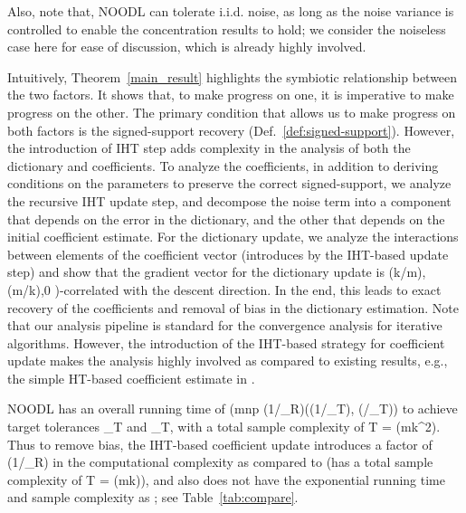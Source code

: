 \documentclass{article}
\def\[#1\]{{$#1$}}
\begin{document}
Also, note that, NOODL can tolerate i.i.d. noise, as long as the noise variance is controlled to enable the concentration results to hold; we consider the noiseless case here for ease of discussion, which is already highly involved.


Intuitively, Theorem~\ref{main_result} highlights the symbiotic relationship between the two factors. It shows that, to make progress on one, it is imperative to make progress on the other. The primary condition that allows us to make progress on both factors is the signed-support recovery (Def.~\ref{def:signed-support}). However, the introduction of IHT step adds complexity in the analysis of both the dictionary and coefficients. To analyze the coefficients, in addition to deriving conditions on the parameters to preserve the correct signed-support, we analyze the recursive IHT update step, and decompose the noise term into a component that depends on the error in the dictionary, and the other that depends on the initial coefficient estimate. For the dictionary update, we analyze the interactions between elements of the coefficient vector (introduces by the IHT-based update step) and show that the gradient vector for the dictionary update is \[(\Omega(k/m), \Omega(m/k),0 )\]-correlated with the descent direction. In the end, this leads to exact recovery of the coefficients and removal of bias in the dictionary estimation. Note that our analysis pipeline is standard for the convergence analysis for iterative algorithms. However, the introduction of the IHT-based strategy for coefficient update makes the analysis highly involved as compared to existing results, e.g., the simple HT-based coefficient estimate in \cite{Arora15}.





NOODL has an overall running time of \[\mathcal{O}(mnp \log(1/\delta_{R})\max(\log(1/\epsilon_{T}), \log(/\delta_T))\] to achieve target tolerances \[\epsilon_{T} \]  and \[\delta_T\], with a total sample complexity of \[ p \cdot T  = \tilde{\Omega}(mk^2)\]. Thus to remove bias, the IHT-based coefficient update introduces a factor of \[\log(1/\delta_{R})\] in the computational complexity as compared to \cite{Arora15} (has a total sample complexity of \[ p\cdot T = \tilde{\Omega}(mk)\]), and also does not have the exponential running time and sample complexity as \cite{Barak2015}; see Table~\ref{tab:compare}.
\end{document}
